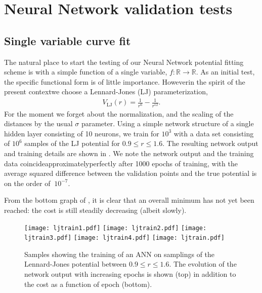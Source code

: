 \documentclass[../../master.tex]{subfiles}
\begin{document}
\chapter{Neural Network validation tests \label{NNvalidation}}
\section{Single variable curve fit}
The natural place to start the testing of our Neural Network potential fitting scheme is with a simple function of a single variable, $f:\mathbb{R}\rightarrow\mathbb{R}$. As an initial test, the specific functional form is of little importance. However\textemdash in the spirit of the present context\textemdash we choose a Lennard-Jones (LJ) parameterization,
\begin{align}
V_\text{LJ}(r) = \frac{1}{r^{6}}-\frac{1}{r^{12}}.
\end{align}
For the moment we forget about the normalization, and the scaling of the distances by the usual $\sigma$ parameter. Using a simple network structure of a single hidden layer consisting of 10 neurons, we train for $10^3$ with a data set consisting of $10^6$ samples of the LJ potential for $0.9\le r\le 1.6$. The resulting network output and training details are shown in . We note the network output and the training data coincide\textemdash approximately\textemdash perfectly after 1000 epochs of training, with the average squared difference between the validation points and the true potential is on the order of $~10^{-7}$. 

From the bottom graph of , it is clear that an overall minimum has not yet been reached: the cost is still steadily decreasing (albeit slowly). 

\begin{figure}
\centering
\texttt{[image: ljtrain1.pdf]}
\texttt{[image: ljtrain2.pdf]}
\texttt{[image: ljtrain3.pdf]}
\texttt{[image: ljtrain4.pdf]}
\texttt{[image: ljtrain.pdf]}
\caption{Samples showing the training of an ANN on samplings of the Lennard-Jones potential between $0.9\le r \le 1.6$. The evolution of the network output with increasing epochs is shown (top) in addition to the cost as a function of epoch (bottom).  \label{fig:ljtrain}}
\end{figure}
\end{document}
